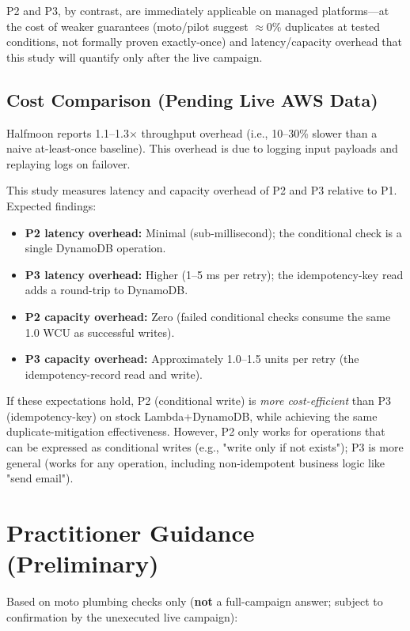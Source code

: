 P2 and P3, by contrast, are immediately applicable on managed platforms---at the cost of weaker guarantees (moto/pilot suggest $\approx 0\%$ duplicates at tested conditions, not formally proven exactly-once) and latency/capacity overhead that this study will quantify only after the live campaign.

\subsection{Cost Comparison (Pending Live AWS Data)}

Halfmoon reports 1.1--1.3$\times$ throughput overhead (i.e., 10--30\% slower than a naive at-least-once baseline). This overhead is due to logging input payloads and replaying logs on failover.

This study measures latency and capacity overhead of P2 and P3 relative to P1. Expected findings:

\begin{itemize}
    \item \textbf{P2 latency overhead:} Minimal (sub-millisecond); the conditional check is a single DynamoDB operation.
    \item \textbf{P3 latency overhead:} Higher (1--5 ms per retry); the idempotency-key read adds a round-trip to DynamoDB.
    \item \textbf{P2 capacity overhead:} Zero (failed conditional checks consume the same 1.0 WCU as successful writes).
    \item \textbf{P3 capacity overhead:} Approximately 1.0--1.5 units per retry (the idempotency-record read and write).
\end{itemize}

If these expectations hold, P2 (conditional write) is \textit{more cost-efficient} than P3 (idempotency-key) on stock Lambda+DynamoDB, while achieving the same duplicate-mitigation effectiveness. However, P2 only works for operations that can be expressed as conditional writes (e.g., "write only if not exists"); P3 is more general (works for any operation, including non-idempotent business logic like "send email").

\section{Practitioner Guidance (Preliminary)}

Based on moto plumbing checks only (\textbf{not} a full-campaign answer; subject to confirmation by the unexecuted live campaign):

